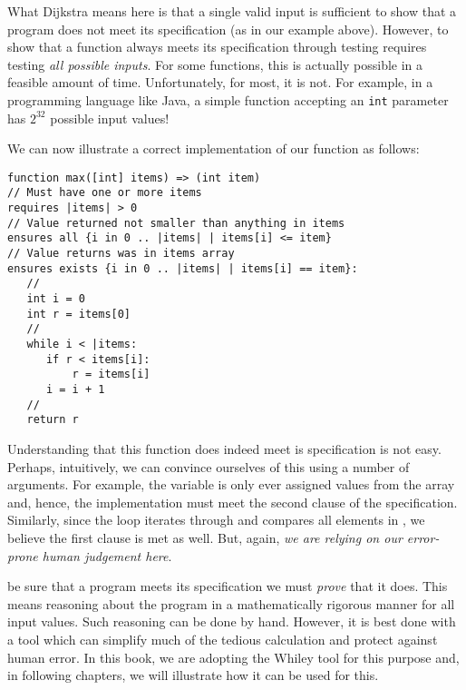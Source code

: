 What Dijkstra means here is that a single valid input is sufficient to show that a program does not meet its specification (as in our example above).  However, to show that a function always meets its specification through testing requires testing {\em all possible inputs}.  For some functions, this is actually possible in a feasible amount of time.  Unfortunately, for most, it is not.  For example, in a programming language like Java, a simple function accepting an \lstinline{int} parameter has $2^{32}$ possible input values!

\begin{eg} We can now illustrate a correct implementation of our  function as follows:

\begin{tcolorbox}\begin{lstlisting}[language=Whiley]
function max([int] items) => (int item) 
// Must have one or more items
requires |items| > 0
// Value returned not smaller than anything in items
ensures all {i in 0 .. |items| | items[i] <= item}
// Value returns was in items array
ensures exists {i in 0 .. |items| | items[i] == item}:
   //
   int i = 0
   int r = items[0]
   //
   while i < |items:
      if r < items[i]:
          r = items[i]
      i = i + 1
   //
   return r
\end{lstlisting}\end{tcolorbox}

Understanding that this function does indeed meet is specification is not easy.  Perhaps, intuitively, we can convince ourselves of this using a number of arguments.  For example, the variable  is only ever assigned values from the  array and, hence, the implementation must meet the second  clause of the specification.  Similarly, since the loop iterates through and compares all elements in , we believe the first  clause is met as well.  But, again, {\em we are relying on our error-prone human judgement here}.  
\end{eg}

 be sure that a program meets its specification we must {\em prove} that it does.  This means reasoning about the program in a mathematically rigorous manner for all input values.  Such reasoning can be done by hand.  However, it is best done with a tool which can simplify much of the tedious calculation and protect against human error.  In this book, we are adopting the Whiley tool for this purpose and, in following chapters, we will illustrate how it can be used for this.

